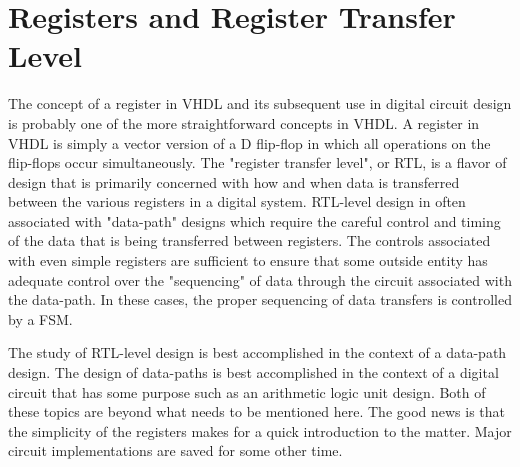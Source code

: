 %
%
%
\chapter{Registers and Register Transfer Level}
The concept of a register in VHDL and its subsequent use in digital circuit design is probably one of the more straightforward concepts in VHDL. A register in VHDL is simply a vector version of a D flip-flop in which all operations on the flip-flops occur simultaneously. The "register transfer level", or RTL, is a flavor of design that is primarily concerned with how and when data is transferred between the various registers in a digital system. RTL-level design in often associated with "data-path" designs which require the careful control and timing of the data that is being transferred between registers. The controls associated with even simple registers are sufficient to ensure that some outside entity has adequate control over the "sequencing" of data through the circuit associated with the data-path. In these cases, the proper sequencing of data transfers is controlled by a FSM. 

The study of RTL-level design is best accomplished in the context of a data-path design. The design of data-paths is best accomplished in the context of a digital circuit that has some purpose such as an arithmetic logic unit design. Both of these topics are beyond what needs to be mentioned here. The good news is that the simplicity of the registers makes for a quick introduction to the matter. Major circuit implementations are saved for some other time.

